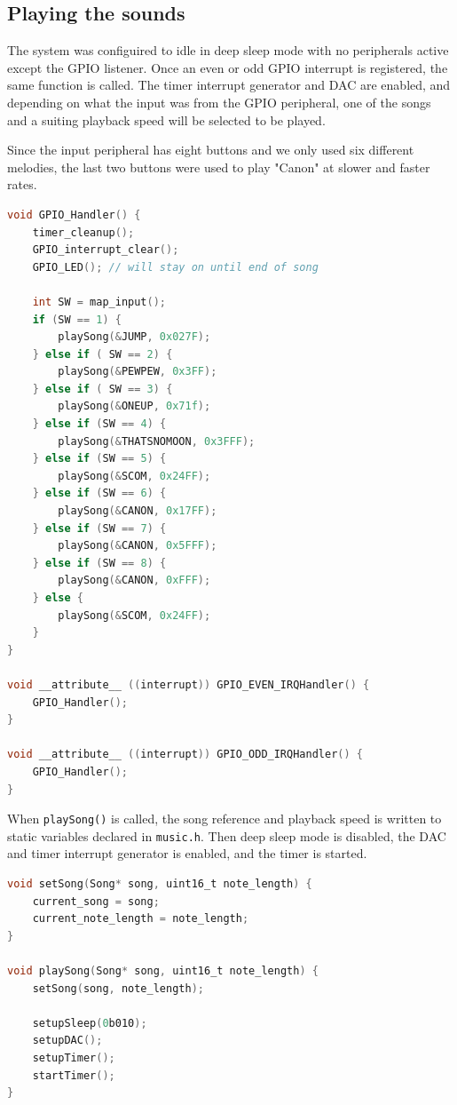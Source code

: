 \subsection{Playing the sounds}
The system was configuired to idle in deep sleep mode with no peripherals active except the GPIO listener. Once an even or odd GPIO interrupt is registered, the same function is called. The timer interrupt generator and DAC are enabled, and depending on what the input was from the GPIO peripheral, one of the songs and a suiting playback speed will be selected to be played.

Since the input peripheral has eight buttons and we only used six different melodies, the last two buttons were used to play "Canon" at slower and faster rates.

\begin{minipage}{\linewidth}
\begin{lstlisting}[language=C, label=interrupt_handlers, caption=GPIO handling from interrupt\_handlers.c]
void GPIO_Handler() {
    timer_cleanup();
    GPIO_interrupt_clear();
    GPIO_LED(); // will stay on until end of song

    int SW = map_input();
    if (SW == 1) {
        playSong(&JUMP, 0x027F);
    } else if ( SW == 2) {
        playSong(&PEWPEW, 0x3FF);
    } else if ( SW == 3) {
        playSong(&ONEUP, 0x71f);
    } else if (SW == 4) {
        playSong(&THATSNOMOON, 0x3FFF);
    } else if (SW == 5) {
        playSong(&SCOM, 0x24FF);
    } else if (SW == 6) {
        playSong(&CANON, 0x17FF);
    } else if (SW == 7) {
        playSong(&CANON, 0x5FFF);
    } else if (SW == 8) {
        playSong(&CANON, 0xFFF);
    } else {
        playSong(&SCOM, 0x24FF);
    }
}

void __attribute__ ((interrupt)) GPIO_EVEN_IRQHandler() { 
    GPIO_Handler();
}

void __attribute__ ((interrupt)) GPIO_ODD_IRQHandler() {
    GPIO_Handler();
}
\end{lstlisting}
\end{minipage}

When \texttt{playSong()} is called, the song reference and playback speed is written to static variables declared in \texttt{music.h}. Then deep sleep mode is disabled, the DAC and timer interrupt generator is enabled, and the timer is started.

\begin{minipage}{\linewidth}
\begin{lstlisting}[language=C, label=playing_music, caption=Excerpts from music.c]
void setSong(Song* song, uint16_t note_length) {
    current_song = song;
    current_note_length = note_length;
}

void playSong(Song* song, uint16_t note_length) {
    setSong(song, note_length);

    setupSleep(0b010);
    setupDAC();
    setupTimer();
    startTimer();
}
\end{lstlisting}
\end{minipage}



